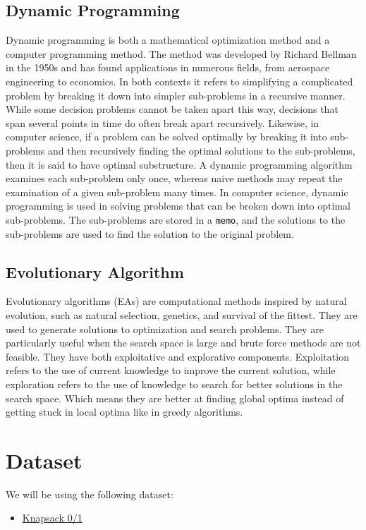 \documentclass{article}
\begin{document}
\subsection*{Dynamic Programming}
Dynamic programming is both a mathematical optimization method and a computer programming method. The method was developed by Richard Bellman in the 1950s and has found applications in numerous fields, from aerospace engineering to economics. In both contexts it refers to simplifying a complicated problem by breaking it down into simpler sub-problems in a recursive manner. While some decision problems cannot be taken apart this way, decisions that span several points in time do often break apart recursively.
Likewise, in computer science, if a problem can be solved optimally by breaking it into sub-problems and then recursively finding the optimal solutions to the sub-problems, then it is said to have optimal substructure. A dynamic programming algorithm examines each sub-problem only once, whereas naive methods may repeat the examination of a given sub-problem many times. In computer science, dynamic programming is used in solving problems that can be broken down into optimal sub-problems.
The sub-problems are stored in a \texttt{memo}, and the solutions to the sub-problems are used to find the solution to the original problem.

\subsection*{Evolutionary Algorithm}
Evolutionary algorithms (EAs) are computational methods inspired by natural evolution, such as natural selection, genetics, and survival of the fittest. They are used to generate solutions to optimization and search problems. They are particularly useful when the search space is large and brute force methods are not feasible. They have both exploitative and explorative components. Exploitation refers to the use of current knowledge to improve the current solution, while exploration refers to the use of knowledge to search for better solutions in the search space. Which means they are better at finding global optima instead of getting stuck in local optima like in greedy algorithms.
\section*{Dataset}
We will be using the following dataset:

\begin{itemize}
    \item \href{https://people.sc.fsu.edu/~jburkardt/datasets/knapsack_01/knapsack_01.html}{Knapsack 0/1}
\end{itemize}
\end{document}
